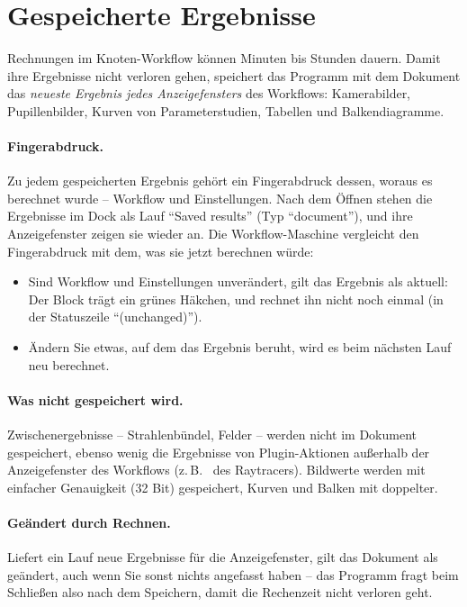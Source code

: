 \section{Gespeicherte Ergebnisse}\label{sec:gespeicherte-ergebnisse}

Rechnungen im Knoten-Workflow können Minuten bis Stunden dauern. Damit ihre Ergebnisse nicht
verloren gehen, speichert das Programm mit dem Dokument das \emph{neueste Ergebnis jedes
Anzeigefensters} des Workflows: Kamerabilder, Pupillenbilder, Kurven von Parameterstudien,
Tabellen und Balkendiagramme.

\paragraph{Fingerabdruck.} Zu jedem gespeicherten Ergebnis gehört ein Fingerabdruck dessen,
woraus es berechnet wurde -- Workflow und Einstellungen. Nach dem Öffnen stehen die
Ergebnisse im Dock  als Lauf \enquote{Saved results} (Typ \enquote{document}),
und ihre Anzeigefenster zeigen sie wieder an. Die Workflow-Maschine vergleicht den
Fingerabdruck mit dem, was sie jetzt berechnen würde:

\begin{itemize}
  \item Sind Workflow und Einstellungen unverändert, gilt das Ergebnis als aktuell: Der Block
    trägt ein grünes Häkchen, und  rechnet ihn nicht noch einmal (in der
    Statuszeile \enquote{(unchanged)}).
  \item Ändern Sie etwas, auf dem das Ergebnis beruht, wird es beim nächsten Lauf neu
    berechnet.
\end{itemize}

\paragraph{Was nicht gespeichert wird.} Zwischenergebnisse -- Strahlenbündel, Felder --
werden nicht im Dokument gespeichert, ebenso wenig die Ergebnisse von Plugin-Aktionen außerhalb
der Anzeigefenster des Workflows (z.\,B.\  des Raytracers). Bildwerte werden
mit einfacher Genauigkeit (32 Bit) gespeichert, Kurven und Balken mit doppelter.

\paragraph{Geändert durch Rechnen.} Liefert ein Lauf neue Ergebnisse für die Anzeigefenster,
gilt das Dokument als geändert, auch wenn Sie sonst nichts angefasst haben -- das Programm
fragt beim Schließen also nach dem Speichern, damit die Rechenzeit nicht verloren geht.
